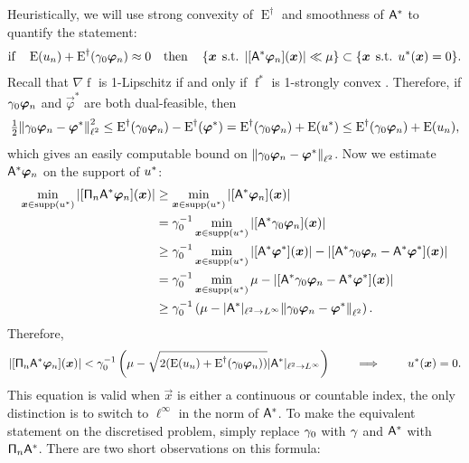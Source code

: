 \documentclass[smallextended]{svjour3}
\newcommand{\norm}[1]{{\left\lVert #1 \right\rVert}}
\newcommand{\op}[1]{\operatorname{#1}}
\newcommand{\1}{\F{1}}
\DeclareMathOperator{\st}{\;s.t.\;}
\DeclareMathOperator{\supp}{supp}
\newcommand*{\var}[1]{%
	\IfEqCase{#1}{%
		{0}{u}%
		{1}{v}%
		{2}{w}%
	}[u#1]%
}
\newcommand*{\vars}[1]{%
	\IfEqCase{#1}{%
		{0}{\alpha}%
		{1}{\beta}%
		{2}{\gamma}%
		{3}{a}%
		{4}{b}%
		{5}{c}%
	}[k#1]%
}
\begin{document}
	Heuristically, we will use strong convexity of $\op{E}^\dag$ and smoothness of $\mathsf{A}^*$ to quantify the statement:
	$$ \text{if}\quad \op{E}(\var0_n) + \op{E}^\dag(\vars2_0 \vec{\varphi}_n) \approx 0 \quad \text{then}\quad \left\{\vec{x}\st |[\A^*\vec{\varphi}_n](\vec{x})|\ll \mu\right\} \subset\{\vec{x} \st \var0^*(\vec{x})=0\}.$$
	Recall that $\nabla\op{f}$ is 1-Lipschitz if and only if $\op{f}^*$ is 1-strongly convex \cite[Chapter 10, Thm. 4.2.2]{Hiriart2013}. Therefore, if $\vars2_0\vec{\varphi}_n$ and $\vec{\varphi}^*$ are both dual-feasible, then
	\begin{equation}
		\tfrac12\norm{\vars2_0\vec{\varphi}_n-\vec{\varphi}^*}_{\ell^2}^2 \leq \op{E}^\dag(\vars2_0\vec{\varphi}_n) - \op{E}^\dag(\vec{\varphi}^*) = \op{E}^\dag(\vars2_0\vec{\varphi}_n) + \op{E}(\var0^*) \leq \op{E}^\dag(\vars2_0\vec{\varphi}_n) + \op{E}(\var0_n),
	\end{equation}
	which gives an easily computable bound on $\norm{\vars2_0\vec{\varphi}_n-\vec{\varphi}^*}_{\ell^2}$. Now we estimate $\A^*\vec{\varphi}_n$ on the support of $\var0^*$:
	\begin{align}
		\min_{\vec{x}\in\supp(\var0^*)} |[\tens{\Pi}_n\A^*\vec{\varphi}_n](\vec{x})| &\geq \min_{\vec{x}\in\supp(\var0^*)} |[\A^*\vec{\varphi}_n](\vec{x})|
		\\&= \vars2_0^{-1}\min_{\vec{x}\in\supp(\var0^*)} |[\A^*\vars2_0 \vec{\varphi}_n](\vec{x})|
		\\&\geq \vars2_0^{-1}\min_{\vec{x}\in\supp(\var0^*)} |[\A^*\vec{\varphi}^*](\vec{x})| - |[\A^*\vars2_0 \vec{\varphi}_n-\A^*\vec{\varphi}^*](\vec{x})|
		\\&= \vars2_0^{-1}\min_{\vec{x}\in\supp(\var0^*)} \mu - |[\A^*\vars2_0 \vec{\varphi}_n-\A^*\vec{\varphi}^*](\vec{x})|
		\\&\geq \vars2_0^{-1}\left(\mu - |\A^*|_{\ell^2\to L^\infty}\norm{\vars2_0 \vec{\varphi}_n-\vec{\varphi}^*}_{\ell^2}\right).
	\end{align}
	Therefore,
	\begin{equation}
		|[\tens{\Pi}_n\A^* \vec{\varphi}_n](\vec{x})|< \vars2_0^{-1}\left(\mu - \sqrt{2(\op{E}(\var0_n)+\op{E}^\dag(\vars2_0\vec{\varphi}_n))}|\A^*|_{\ell^2\to L^\infty}\right) \qquad \implies \qquad \var0^*(\vec{x})= 0.\label{eq: support equation}
	\end{equation}
	This equation is valid when $\vec{x}$ is either a continuous or countable index, the only distinction is to switch to $\ell^\infty$ in the norm of $\mathsf{A}^*$. To make the equivalent statement on the discretised problem, simply replace $\vars2_0$ with $\vars2$ and $\mathsf{A}^*$ with $\mathsf{\Pi}_n\mathsf{A}^*$. There are two short observations on this formula:
\end{document}
